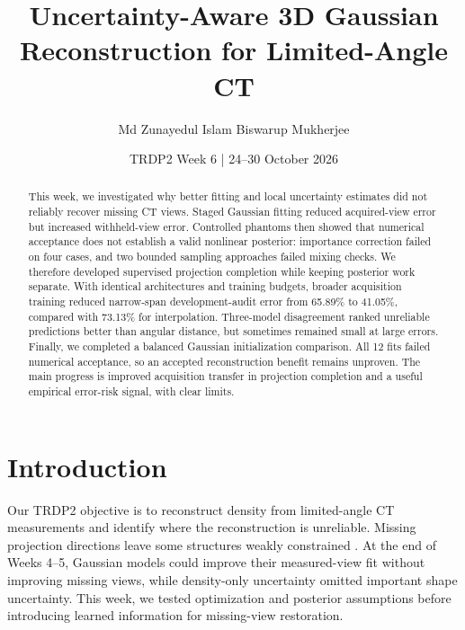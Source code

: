 \documentclass[11pt,a4paper]{article}
\title{\vspace{-1.1cm}\LARGE\bfseries Uncertainty-Aware 3D Gaussian Reconstruction for Limited-Angle CT}
\author{\normalsize Md Zunayedul Islam \qquad Biswarup Mukherjee}
\date{\small TRDP2 Week 6 | 24--30 October 2026}
\begin{document}
\raggedbottom
\maketitle\vspace{-1.2em}
\begin{abstract}
This week, we investigated why better fitting and local uncertainty estimates did not reliably recover missing CT views. Staged Gaussian fitting reduced acquired-view error but increased withheld-view error. Controlled phantoms then showed that numerical acceptance does not establish a valid nonlinear posterior: importance correction failed on four cases, and two bounded sampling approaches failed mixing checks. We therefore developed supervised projection completion while keeping posterior work separate. With identical architectures and training budgets, broader acquisition training reduced narrow-span development-audit error from 65.89\% to 41.05\%, compared with 73.13\% for interpolation. Three-model disagreement ranked unreliable predictions better than angular distance, but sometimes remained small at large errors. Finally, we completed a balanced Gaussian initialization comparison. All 12 fits failed numerical acceptance, so an accepted reconstruction benefit remains unproven. The main progress is improved acquisition transfer in projection completion and a useful empirical error-risk signal, with clear limits.
\end{abstract}
\section{Introduction}
Our TRDP2 objective is to reconstruct density from limited-angle CT measurements and identify where the reconstruction is unreliable. Missing projection directions leave some structures weakly constrained \cite{kak}. At the end of Weeks 4--5, Gaussian models could improve their measured-view fit without improving missing views, while density-only uncertainty omitted important shape uncertainty. This week, we tested optimization and posterior assumptions before introducing learned information for missing-view restoration.
\end{document}

